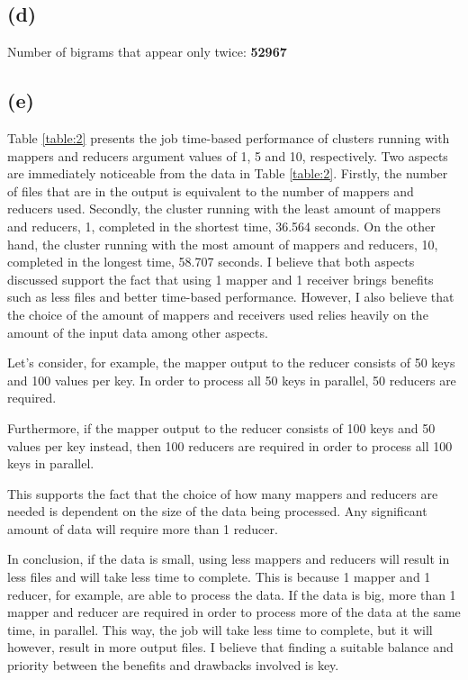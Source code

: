 \documentclass{article} %
\begin{document}
\subsection*{(d)}

Number of bigrams that appear only twice: \textbf{52967}

\subsection*{(e)}

Table \ref{table:2} presents the job time-based performance of clusters running with mappers and reducers argument values of 1, 5 and 10, respectively. Two aspects are immediately noticeable from the data in Table \ref{table:2}. Firstly, the number of files that are in the output is equivalent to the number of mappers and reducers used. Secondly, the cluster running with the least amount of mappers and reducers, 1, completed in the shortest time, 36.564 seconds. On the other hand, the cluster running with the most amount of mappers and reducers, 10, completed in the longest time, 58.707 seconds. I believe that both aspects discussed support the fact that using 1 mapper and 1 receiver brings benefits such as less files and better time-based performance. However, I also believe that the choice of the amount of mappers and receivers used relies heavily on the amount of the input data among other aspects.

Let's consider, for example, the mapper output to the reducer consists of 50 keys and 100 values per key. In order to process all 50 keys in parallel, 50 reducers are required.

Furthermore, if the mapper output to the reducer consists of 100 keys and 50 values per key instead, then 100 reducers are required in order to process all 100 keys in parallel.

This supports the fact that the choice of how many mappers and reducers are needed is dependent on the size of the data being processed. Any significant amount of data will require more than 1 reducer.

In conclusion, if the data is small, using less mappers and reducers will result in less files and will take less time to complete. This is because 1 mapper and 1 reducer, for example, are able to process the data. If the data is big, more than 1 mapper and reducer are required in order to process more of the data at the same time, in parallel. This way, the job will take less time to complete, but it will however, result in more output files. I believe that finding a suitable balance and priority between the benefits and drawbacks involved is key.
\end{document}

